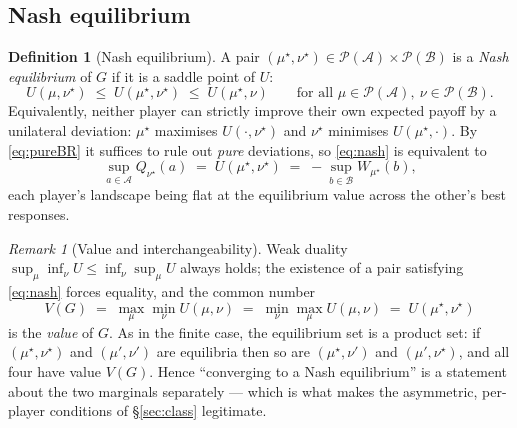 \documentclass[11pt]{article}
\theoremstyle{definition}
\newtheorem{definition}{Definition}
\theoremstyle{remark}
\newtheorem{remark}{Remark}
\newcommand{\cA}{\mathcal{A}}
\newcommand{\cB}{\mathcal{B}}
\newcommand{\cP}{\mathcal{P}}
\begin{document}
\subsection{Nash equilibrium}

\begin{definition}[Nash equilibrium]\label{def:nash}
A pair $(\mu^\star,\nu^\star) \in \cP(\cA) \times \cP(\cB)$ is a \emph{Nash
equilibrium} of $G$ if it is a saddle point of $U$:
\begin{equation}\label{eq:nash}
  U(\mu,\nu^\star) \;\le\; U(\mu^\star,\nu^\star) \;\le\; U(\mu^\star,\nu)
  \qquad \text{for all } \mu \in \cP(\cA),\ \nu \in \cP(\cB).
\end{equation}
Equivalently, neither player can strictly improve their own expected payoff by a
unilateral deviation: $\mu^\star$ maximises $U(\cdot,\nu^\star)$ and $\nu^\star$
minimises $U(\mu^\star,\cdot)$. By \eqref{eq:pureBR} it suffices to rule out
\emph{pure} deviations, so \eqref{eq:nash} is equivalent to
\[
  \sup_{a \in \cA} Q_{\nu^\star}(a)
  \;=\; U(\mu^\star,\nu^\star)
  \;=\; -\sup_{b \in \cB} W_{\mu^\star}(b),
\]
each player's landscape being flat at the equilibrium value across the other's
best responses.
\end{definition}

\begin{remark}[Value and interchangeability]\label{rem:value}
Weak duality $\sup_\mu \inf_\nu U \le \inf_\nu \sup_\mu U$ always holds; the
existence of a pair satisfying \eqref{eq:nash} forces equality, and the common
number
\[
  V(G) \;=\; \max_{\mu} \min_{\nu} U(\mu,\nu)
        \;=\; \min_{\nu} \max_{\mu} U(\mu,\nu)
        \;=\; U(\mu^\star,\nu^\star)
\]
is the \emph{value} of $G$. As in the finite case, the equilibrium set is a
product set: if $(\mu^\star,\nu^\star)$ and $(\mu',\nu')$ are equilibria then so
are $(\mu^\star,\nu')$ and $(\mu',\nu^\star)$, and all four have value $V(G)$.
Hence ``converging to a Nash equilibrium'' is a statement about the two marginals
separately --- which is what makes the asymmetric, per-player conditions of
\S\ref{sec:class} legitimate.
\end{remark}
\end{document}

